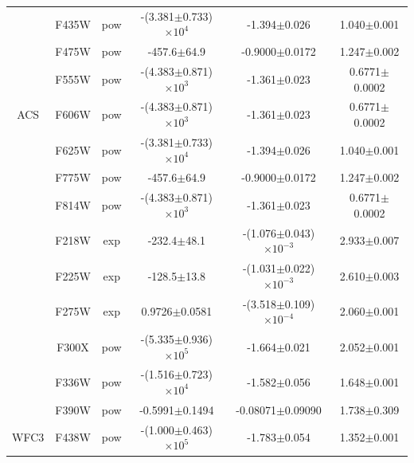 \documentclass[12pt, a4paper]{report}
\begin{document}
\begin{table}
\begin{center}
\begin{tabular}{cccccc}
& F435W & pow & -(3.381$\pm$0.733)$\times 10^{4}$ & -1.394$\pm$0.026 & 1.040$\pm$0.001 \\
& F475W & pow & -457.6$\pm$64.9 & -0.9000$\pm$0.0172 & 1.247$\pm$0.002 \\
& F555W & pow & -(4.383$\pm$0.871)$\times 10^{3}$ & -1.361$\pm$0.023 & 0.6771$\pm$0.0002 \\
ACS & F606W & pow & -(4.383$\pm$0.871)$\times 10^{3}$ & -1.361$\pm$0.023 & 0.6771$\pm$0.0002 \\
& F625W & pow & -(3.381$\pm$0.733)$\times 10^{4}$ & -1.394$\pm$0.026 & 1.040$\pm$0.001 \\
& F775W & pow & -457.6$\pm$64.9 & -0.9000$\pm$0.0172 & 1.247$\pm$0.002 \\
& F814W & pow & -(4.383$\pm$0.871)$\times 10^{3}$ & -1.361$\pm$0.023 & 0.6771$\pm$0.0002 \\ \hline
& F218W & exp & -232.4$\pm$48.1 & -(1.076$\pm$0.043)$\times 10^{-3}$ & 2.933$\pm$0.007 \\
& F225W & exp & -128.5$\pm$13.8 & -(1.031$\pm$0.022)$\times 10^{-3}$ & 2.610$\pm$0.003 \\
& F275W & exp & 0.9726$\pm$0.0581 & -(3.518$\pm$0.109)$\times 10^{-4}$ & 2.060$\pm$0.001 \\
& F300X & pow & -(5.335$\pm$0.936)$\times 10^{5}$ & -1.664$\pm$0.021 & 2.052$\pm$0.001 \\
& F336W & pow & -(1.516$\pm$0.723)$\times 10^{4}$ & -1.582$\pm$0.056 & 1.648$\pm$0.001 \\
& F390W & pow & -0.5991$\pm$0.1494 & -0.08071$\pm$0.09090 & 1.738$\pm$0.309 \\
WFC3 & F438W & pow & -(1.000$\pm$0.463)$\times 10^{5}$ & -1.783$\pm$0.054 & 1.352$\pm$0.001 \\

\end{tabular}
\end{center}
\end{table}
\end{document}
